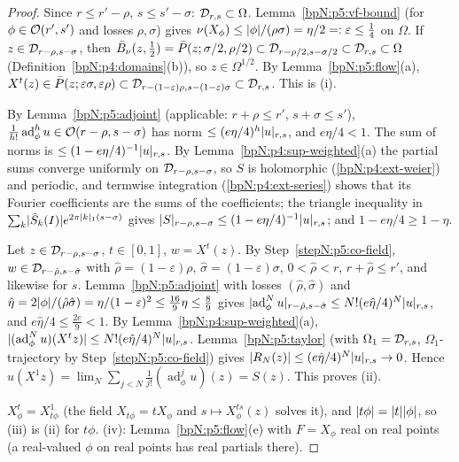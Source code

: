 \begin{proof}
\label{stepN:p5:co-field} Since $r\le r'-\rho$, $s\le s'-\sigma$: $\mathcal D_{r,s}\subset\Omega$. Lemma~\ref{bpN:p5:vf-bound} (for $\phi\in\mathcal O(r',s')$ and losses $\rho,\sigma$) gives $\nu(X_\phi)\le\lvert \phi\rvert/(\rho\sigma)=\eta/2=:\varepsilon\le\frac14$ on $\Omega$.
If $z\in\mathcal D_{r-\rho,s-\sigma}$, then $\bar B_\nu(z,\frac12)=\bar P(z;\sigma/2,\rho/2)\subset\mathcal D_{r-\rho/2,s-\sigma/2}\subset\mathcal D_{r,s}\subset\Omega$ (Definition~\ref{bpN:p4:domains}(b)), so $z\in\Omega^{1/2}$. By Lemma~\ref{bpN:p5:flow}(a), $X^t(z)\in\bar P(z;\varepsilon\sigma,\varepsilon\rho)\subset\mathcal D_{r-(1-\varepsilon)\rho,s-(1-\varepsilon)\sigma}\subset\mathcal D_{r,s}$. This is (i).

\label{stepN:p5:co-series} By Lemma~\ref{bpN:p5:adjoint} (applicable: $r+\rho\le r'$, $s+\sigma\le s'$), $\frac1{h!}\operatorname{ad}^h_\phi u\in\mathcal O(r-\rho,s-\sigma)$ has norm $\le(e\eta/4)^h\lvert u\rvert_{r,s}$, and $e\eta/4<1$. The sum of norms is $\le(1-e\eta/4)^{-1}\lvert u\rvert_{r,s}$. By Lemma~\ref{bpN:p4:sup-weighted}(a) the partial sums converge uniformly on $\mathcal D_{r-\rho,s-\sigma}$, so
$S$ is holomorphic (\ref{bpN:p4:ext-weier}) and periodic, and termwise integration (\ref{bpN:p4:ext-series}) shows that its Fourier coefficients are the sums of the coefficients; the triangle inequality in $\sum_k\lvert \hat S_k(I)\rvert e^{2\pi\lvert k\rvert_1(s-\sigma)}$ gives $\lvert S\rvert_{r-\rho,s-\sigma}\le(1-e\eta/4)^{-1}\lvert u\rvert_{r,s}$; and $1-e\eta/4\ge1-\eta$.

\label{stepN:p5:co-remainder} Let $z\in\mathcal D_{r-\rho,s-\sigma}$, $t\in[0,1]$, $w=X^t(z)$. By Step~\ref{stepN:p5:co-field}, $w\in\mathcal D_{r-\hat\rho,s-\hat\sigma}$ with $\hat\rho=(1-\varepsilon)\rho$, $\hat\sigma=(1-\varepsilon)\sigma$, $0<\hat\rho<r$, $r+\hat\rho\le r'$, and likewise for $s$.
Lemma~\ref{bpN:p5:adjoint} with losses $(\hat\rho,\hat\sigma)$ and $\hat\eta=2\lvert \phi\rvert/(\hat\rho\hat\sigma)=\eta/(1-\varepsilon)^2\le\frac{16}9\eta\le\frac89$ gives $\lvert \operatorname{ad}^N_\phi u\rvert_{r-\hat\rho,s-\hat\sigma}\le N!(e\hat\eta/4)^N\lvert u\rvert_{r,s}$, and $e\hat\eta/4\le\frac{2e}9<1$. By Lemma~\ref{bpN:p4:sup-weighted}(a), $\lvert (\operatorname{ad}^N_\phi u)(X^tz)\rvert\le N!(e\hat\eta/4)^N\lvert u\rvert_{r,s}$.
Lemma~\ref{bpN:p5:taylor} (with $\Omega_1=\mathcal D_{r,s}$, $\Omega_1$-trajectory by Step~\ref{stepN:p5:co-field}) gives $\lvert R_N(z)\rvert\le(e\hat\eta/4)^N\lvert u\rvert_{r,s}\to0$. Hence $u(X^1z)=\lim_N\sum_{j<N}\frac1{j!}(\operatorname{ad}^j_\phi u)(z)=S(z)$. This proves (ii).

\label{stepN:p5:co-t} $X^t_\phi=X^1_{t\phi}$ (the field $X_{t\phi}=tX_\phi$ and $s\mapsto X^{ts}_\phi(z)$ solves it), and $\lvert t\phi\rvert=\lvert t\rvert\lvert \phi\rvert$, so (iii) is (ii) for $t\phi$. (iv): Lemma~\ref{bpN:p5:flow}(e) with $F=X_\phi$ real on real points (a real-valued $\phi$ on real points has real partials there).
\end{proof}

